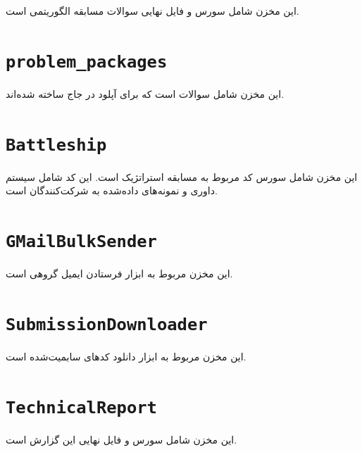 \documentclass{report}
\begin{document}
این مخزن شامل سورس و فایل نهایی سوالات مسابقه الگوریتمی است.
\cprotect\section{\verb|problem_packages|}
این مخزن شامل  سوالات است که برای آپلود در جاج ساخته شده‌اند.
\cprotect\section{\verb|Battleship|}
این مخزن شامل سورس کد مربوط به مسابقه استراتژیک است. این کد شامل سیستم داوری و نمونه‌های داده‌شده به شرکت‌کنندگان است.
\cprotect\section{\verb|GMailBulkSender|}
این مخزن مربوط به ابزار فرستادن ایمیل گروهی است.
\cprotect\section{\verb|SubmissionDownloader|}
این مخزن مربوط به ابزار دانلود کدهای سابمیت‌شده است.
\cprotect\section{\verb|TechnicalReport|}
این مخزن شامل سورس و فایل نهایی این گزارش است.
\end{document}
